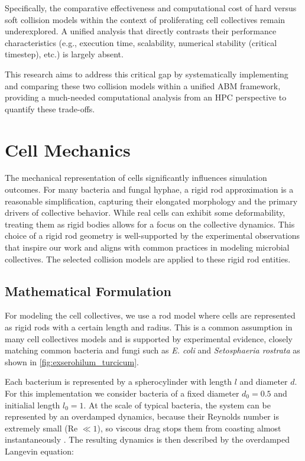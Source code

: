 \documentclass[conference]{IEEEtran}
\begin{document}
Specifically, the comparative effectiveness and computational cost of hard versus soft collision models within the context of proliferating cell collectives remain underexplored. A unified analysis that directly contrasts their performance characteristics (e.g., execution time, scalability, numerical stability (critical timestep), etc.) is largely absent.

This research aims to address this critical gap by systematically implementing and comparing these two collision models within a unified ABM framework, providing a much-needed computational analysis from an HPC perspective to quantify these trade-offs.

\section{Cell Mechanics}

The mechanical representation of cells significantly influences simulation outcomes. For many bacteria and fungal hyphae, a rigid rod approximation is a reasonable simplification, capturing their elongated morphology and the primary drivers of collective behavior. While real cells can exhibit some deformability, treating them as rigid bodies allows for a focus on the collective dynamics. This choice of a rigid rod geometry is well-supported by the experimental observations that inspire our work and aligns with common practices in modeling microbial collectives. The selected collision models are applied to these rigid rod entities.

\subsection{Mathematical Formulation}

For modeling the cell collectives, we use a rod model where cells are represented as rigid rods with a certain length and radius. This is a common assumption in many cell collectives models \cite{You2018}\cite{Weady2024}\cite{Blanchard2015}\cite{Warren2019}\cite{Ghosh2015} and is supported by experimental evidence, closely matching common bacteria and fungi such as \textit{E. coli} and \textit{Setosphaeria rostrata} as shown in \autoref{fig:exserohilum_turcicum}.


Each bacterium is represented by a spherocylinder with length $l$ and diameter $d$. For this implementation we consider bacteria of a fixed diameter $d_0 = 0.5$ and initialial length $l_0 = 1$. At the scale of typical bacteria, the system can be represented by an overdamped dynamics, because their Reynolds number is extremely small (Re $\ll 1$), so viscous drag stops them from coasting almost instantaneously \cite{datta2024lifelowreynoldsnumber}. The resulting dynamics is then described by the overdamped Langevin equation:
\end{document}
